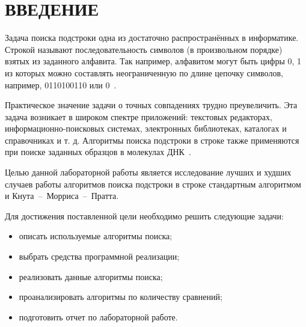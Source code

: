 \section*{ВВЕДЕНИЕ}

Задача поиска подстроки одна из достаточно распространённых в информатике. Строкой называют последовательность символов (в произвольном порядке) взятых из заданного алфавита. Так например, алфавитом могут быть цифры {0, 1} из которых можно составлять неограниченную по длине цепочку символов, например, 0110100110 или 0~\cite{max}. 

Практическое значение задачи о точных совпадениях трудно преувеличить. 
Эта задача возникает в широком спектре приложений: текстовых редакторах, информационно-поисковых системах, электронных библиотеках, каталогах и справочниках и т. д. 
Алгоритмы поиска подстроки в строке также применяются при поиске заданных образцов в молекулах ДНК~\cite{алексеенко2010информационная}.


Целью данной лабораторной работы является исследование лучших и худших случаев работы алгоритмов поиска подстроки в строке стандартным алгоритмом и Кнута~--~Морриса~--~Пратта.

Для достижения поставленной цели необходимо решить следующие задачи:
\begin{itemize}
	\item описать используемые алгоритмы поиска;
	\item выбрать средства программной реализации;
	\item реализовать данные алгоритмы поиска;
	\item проанализировать алгоритмы по количеству сравнений;
	\item подготовить отчет по лабораторной работе.
\end{itemize}
